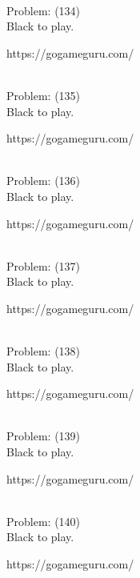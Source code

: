 \documentclass[11pt]{article}
\begin{document}
\begin{minipage}[t]{0.5\textwidth}
  {\centering
  
\\
Problem: (134)\\
Black to play.

https://gogameguru.com/\\
  }
\end{minipage}
\begin{minipage}[t]{0.5\textwidth}
  {\centering
  
\\
Problem: (135)\\
Black to play.

https://gogameguru.com/\\
  }
\end{minipage}
\begin{minipage}[t]{0.5\textwidth}
  {\centering
  
\\
Problem: (136)\\
Black to play.

https://gogameguru.com/\\
  }
\end{minipage}
\begin{minipage}[t]{0.5\textwidth}
  {\centering
  
\\
Problem: (137)\\
Black to play.

https://gogameguru.com/\\
  }
\end{minipage}
\begin{minipage}[t]{0.5\textwidth}
  {\centering
  
\\
Problem: (138)\\
Black to play.

https://gogameguru.com/\\
  }
\end{minipage}
\begin{minipage}[t]{0.5\textwidth}
  {\centering
  
\\
Problem: (139)\\
Black to play.

https://gogameguru.com/\\
  }
\end{minipage}
\begin{minipage}[t]{0.5\textwidth}
  {\centering
  
\\
Problem: (140)\\
Black to play.

https://gogameguru.com/\\
  }
\end{minipage}
\end{document}
